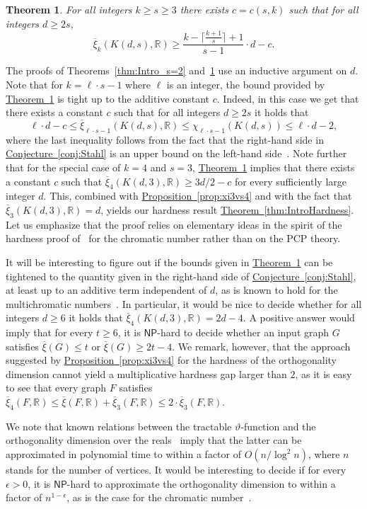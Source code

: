 \documentclass[11pt]{article}
\numberwithin{equation}{section}
\newtheorem{theorem}{Theorem}[section]
\theoremstyle{definition}
\theoremstyle{plain}
\newcommand{\R}{\mathbb R}
\newcommand{\expref}[2]{\hyperref[#2]{#1~\ref{#2}}}
\newcommand{\NP}{\mathsf{NP}}
\newcommand{\od}{\overline{\xi}}
\newcommand{\eps}{\epsilon}
\begin{document}
\begin{theorem}\label{thm:Intro_general_s}
For %
all %
integers $k \geq s \geq 3$ there exists $c=c(s,k)$ such that for all integers $d \geq 2s$,
\[\od_{k}(K(d,s),\R) \geq \frac{k- \lceil \frac{k+1}{s} \rceil +1}{s-1} \cdot d-c.\]
\end{theorem}
%
%
%
%
\noindent
The proofs of Theorems~\ref{thm:Intro_s=2} and~\ref{thm:Intro_general_s} use an inductive argument on $d$.
Note that for $k = \ell \cdot s -1$ where $\ell$ is an integer, the bound provided by \expref{Theorem}{thm:Intro_general_s} is tight up to the additive constant $c$.
Indeed, in this case we get that there exists a constant $c$ such that for all integers $d \geq 2s$ it holds that
\[\ell \cdot d -c \leq \od_{\ell \cdot s-1}(K(d,s),\R) \leq \chi_{\ell \cdot s-1}(K(d,s)) \leq \ell \cdot d -2,\]
where the last inequality follows from the fact that the right-hand side in \expref{Conjecture}{conj:Stahl} is an upper bound on the left-hand side~\cite{Stahl76}.
Note further that for the special case of $k=4$ and $s=3$, \expref{Theorem}{thm:Intro_general_s} implies that there exists a constant $c$ such that $\od_4(K(d,3),\R) \geq 3d/2-c$ for every sufficiently large integer $d$. This, combined with \expref{Proposition}{prop:xi3vs4} and with the fact that $\od_3(K(d,3),\R) = d$, yields our hardness result \expref{Theorem}{thm:IntroHardness}.
%
Let us emphasize that the proof relies on elementary ideas in the spirit of the hardness proof of~\cite{GareyJ76a} for the chromatic number rather than on the PCP theory.

It will be interesting to figure out if the bounds given in \expref{Theorem}{thm:Intro_general_s} can be tightened to the quantity given in the right-hand side of \expref{Conjecture}{conj:Stahl}, at least up to an additive term independent of $d$, as is known to hold for the multichromatic numbers~\cite{Stahl98}.
%
%
%
%
%
%
In particular, it %
would  %
be nice to decide whether for all integers $d \geq 6$ it holds that $\od_4(K(d,3),\R) = 2d-4$.
A positive answer would imply that for every $t \geq 6$, it is $\NP$-hard to decide whether an input graph $G$ satisfies $\od(G) \leq t$ or $\od(G) \geq 2t-4$. We remark, however, that the approach suggested by \expref{Proposition}{prop:xi3vs4} for the hardness of the orthogonality dimension cannot yield a multiplicative hardness gap larger than $2$, as it is easy to see that every graph $F$ satisfies $\od_4(F,\R) \leq \od(F,\R) + \od_3(F,\R) \leq 2 \cdot \od_3(F,\R)$.

We note that known relations between the tractable $\vartheta$-function and the orthogonality dimension over the reals~\cite{Lovasz79} imply that the latter can be approximated in polynomial time to within a factor of $O(n/\log^2 n)$, where $n$ stands for the number of vertices.
It would be interesting to decide if for %
%
every  %
$\eps >0$, it is $\NP$-hard to approximate the orthogonality dimension to within a factor of $n^{1-\eps}$, as is the case for the chromatic number~\cite{Zuckerman07}.
\end{document}
